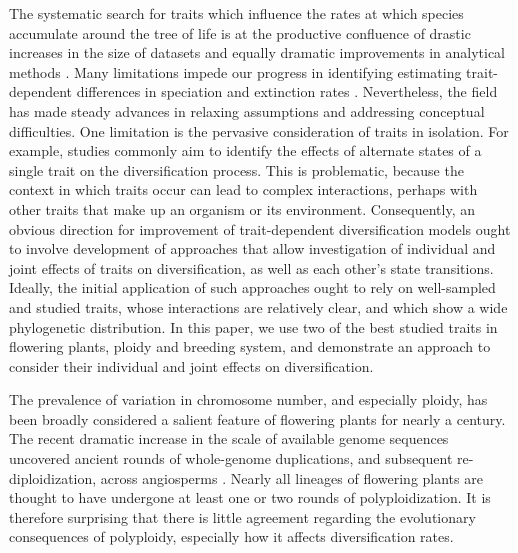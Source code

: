 The systematic search for traits which influence the rates at which species accumulate around the tree of life is at the productive confluence of drastic increases in the size of datasets and equally dramatic improvements in analytical methods \citep{maddison_2007,fitzjohn_2009,goldberg_2012,beaulieu_2015}. %
Many limitations impede our progress in identifying estimating trait-dependent differences in speciation and extinction rates \citep{maddison_2015, rabosky_2015}. %
Nevertheless, the field has made steady advances in relaxing assumptions and addressing conceptual difficulties. %
One limitation is the pervasive consideration of traits in isolation. 
For example, studies commonly aim to identify the effects of alternate states of a single trait on the diversification process. 
This is problematic, because the context in which traits occur can lead to complex interactions, perhaps with other traits that make up an organism or its environment.
Consequently, an obvious direction for improvement of trait-dependent diversification models ought to involve development of approaches that allow investigation of individual and joint effects of traits on diversification, as well as each other's state transitions.
Ideally, the initial application of such approaches ought to rely on well-sampled and studied traits, whose interactions are relatively clear, and which show a wide phylogenetic distribution. 
In this paper, we use two of the best studied traits in flowering plants, ploidy and breeding system, and demonstrate an approach to consider their individual and joint effects on diversification.

The prevalence of variation in chromosome number, and especially ploidy, has been broadly considered a salient feature of flowering plants for nearly a century. %
The recent dramatic increase in the scale of available genome sequences uncovered ancient rounds of whole-genome duplications, and subsequent re-diploidization, across angiosperms \citep{lynch2000,vision2000}. 
Nearly all lineages of flowering plants are thought to have undergone at least one or two rounds of polyploidization. %
It is therefore surprising that there is little agreement regarding the evolutionary consequences of polyploidy, especially how it affects diversification rates. %

